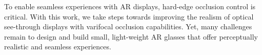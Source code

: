 To enable seamless experiences with AR displays, hard-edge occlusion control is critical. 
With this work, we take steps towards improving the realism of optical see-through displays with varifocal occlusion capabilities. 
Yet, many challenges remain to design and build small, light-weight AR glasses that offer perceptually realistic and seamless experiences.


